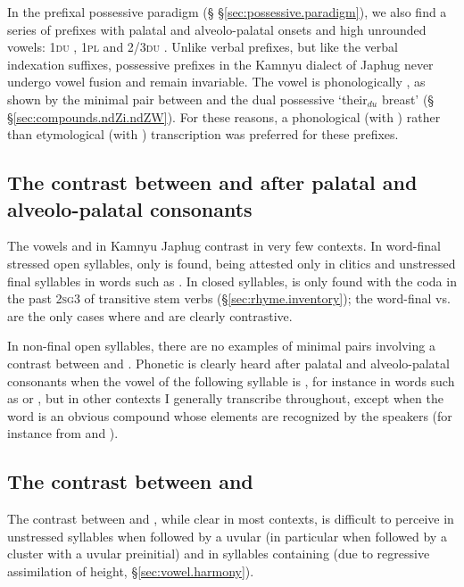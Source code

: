 In the prefixal possessive paradigm (§ §\ref{sec:possessive.paradigm}), we also find a series of prefixes with palatal and alveolo-palatal onsets and high unrounded vowels: \textsc{1du} , \textsc{1pl}  and \textsc{2/3du} . Unlike verbal prefixes, but like the verbal indexation suffixes, possessive prefixes in the Kamnyu dialect of Japhug never undergo vowel fusion and remain invariable. The vowel is phonologically , as shown by the minimal pair between  and the dual possessive  `their$_{du}$ breast' (§ §\ref{sec:compounds.ndZi.ndZW}). For these reasons, a phonological (with ) rather than etymological (with ) transcription was preferred for these prefixes.

\subsection{The contrast between  and  after palatal and alveolo-palatal consonants}
The vowels  and  in Kamnyu Japhug contrast in very few contexts. In word-final stressed open syllables, only  is found,  being attested only in clitics and unstressed final syllables in words such as . In closed syllables,  is only found with the coda  in the past \textsc{2sg}\fl{}3 of transitive  stem verbs (§\ref{sec:rhyme.inventory}); the word-final  vs.  are the only cases where  and  are clearly contrastive.

In non-final open syllables, there are no examples of minimal pairs involving a contrast between  and . Phonetic  is clearly heard after palatal and alveolo-palatal consonants when the vowel of the following syllable is , for instance in words such as  or , but in other contexts I generally transcribe  throughout, except when the word is an obvious compound whose elements are recognized by the speakers (for instance  from  and ). 

\subsection{The contrast between  and } \label{sec:A.vs.a.prefixes}
The contrast between  and , while clear in most contexts, is difficult to perceive in unstressed syllables when followed by a uvular (in particular when followed by a cluster with a uvular preinitial) and in syllables containing  (due to regressive assimilation of height, §\ref{sec:vowel.harmony}).

